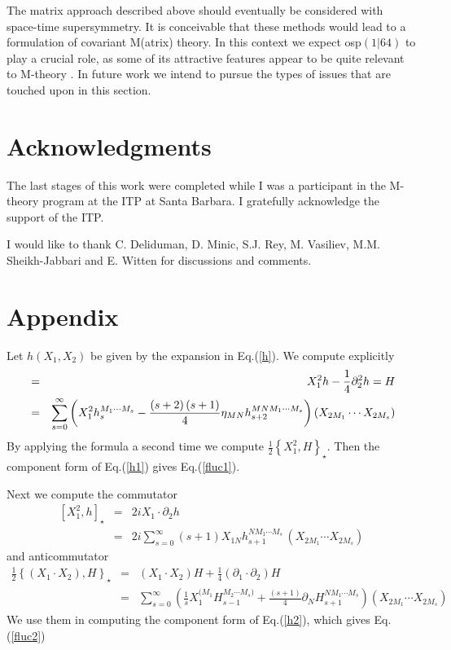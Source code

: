 \documentclass[a4paper,12pt]{article}
\begin{document}
The matrix approach described above should eventually be considered with
space-time supersymmetry. It is conceivable that these methods would lead to
a formulation of covariant M(atrix) theory. In this context we expect osp$%
\left( 1|64\right) $ to play a crucial role, as some of its attractive
features appear to be quite relevant to M-theory \cite{S-theory}\cite
{super2t}\cite{west}\cite{ferrara}. In future work we intend to pursue the
types of issues that are touched upon in this section.

\section*{Acknowledgments}

The last stages of this work were completed while I was a participant in the
M-theory program at the ITP at Santa Barbara. I gratefully acknowledge the
support of the ITP.

I would like to thank C. Deliduman, D. Minic, S.J. Rey, M. Vasiliev, M.M.
Sheikh-Jabbari and E. Witten for discussions and comments.

\section{Appendix}

Let $h\left( X_{1},X_{2}\right) $ be given by the expansion in Eq.(\ref{h}).
We compute explicitly 
\begin{eqnarray}
&=&X_{1}^{2}h-\frac{1}{4}\partial _{2}^{2}h=H \\
&=&\sum_{s=0}^{\infty }\left( X_{1}^{2}h_{s}^{M_{1}\cdots M_{s}}-\frac{%
\left( s+2\right) \left( s+1\right) }{4}\eta _{MN}h_{s+2}^{MNM_{1}\cdots
M_{s}}\right) \left( X_{2M_{1}}\cdots X_{2M_{s}}\right)
\end{eqnarray}
By applying the formula a second time we compute $\frac{1}{2}\left\{
X_{1}^{2},H\right\} _{\star }.$ Then the component form of Eq.(\ref{h1})
gives Eq.(\ref{fluc1}).

Next we compute the commutator 
\begin{eqnarray}
\left[ X_{1}^{2},h\right] _{\star } &=&2iX_{1}\cdot \partial _{2}h \\
&=&2i\sum_{s=0}^{\infty }\left( s+1\right) X_{1N}h_{s+1}^{NM_{1}\cdots
M_{s}}\,\left( X_{2M_{1}}\cdots X_{2M_{s}}\right)
\end{eqnarray}
and anticommutator $\ $%
\begin{eqnarray}
\frac{1}{2}\left\{ \left( X_{1}\cdot X_{2}\right) ,H\right\} _{\star }
&=&\left( X_{1}\cdot X_{2}\right) H+\frac{1}{4}\left( \partial _{1}\cdot
\partial _{2}\right) H \\
&=&\sum_{s=0}^{\infty }\left( \frac{1}{s}X_{1}^{(M_{1}}H_{s-1}^{M_{2}\cdots
M_{s})}+\frac{\left( s+1\right) }{4}\partial _{N}H_{s+1}^{NM_{1}\cdots
M_{s}}\right) \left( X_{2M_{1}}\cdots X_{2M_{s}}\right)
\end{eqnarray}
We use them in computing the component form of Eq.(\ref{h2}), which gives
Eq.(\ref{fluc2})
\end{document}
